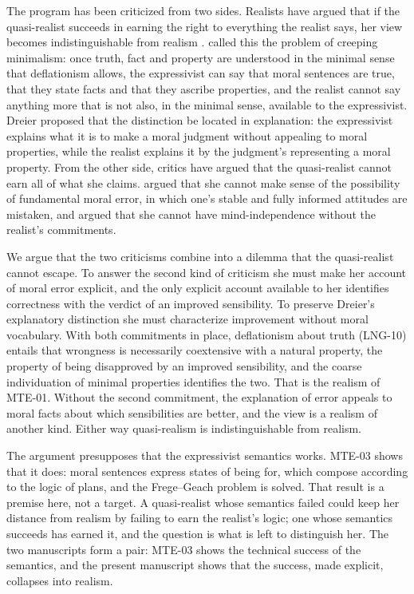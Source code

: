 \documentclass{situationist-preprint}
\begin{document}
The program has been criticized from two sides. Realists have argued that if the quasi-realist succeeds in earning the right to everything the realist says, her view becomes indistinguishable from realism \citep{Wright1992,Rosen1998,Dworkin1996}. \citet{Dreier2004} called this the problem of creeping minimalism: once truth, fact and property are understood in the minimal sense that deflationism allows, the expressivist can say that moral sentences are true, that they state facts and that they ascribe properties, and the realist cannot say anything more that is not also, in the minimal sense, available to the expressivist. Dreier proposed that the distinction be located in explanation: the expressivist explains what it is to make a moral judgment without appealing to moral properties, while the realist explains it by the judgment's representing a moral property. From the other side, critics have argued that the quasi-realist cannot earn all of what she claims. \citet{Egan2007} argued that she cannot make sense of the possibility of fundamental moral error, in which one's stable and fully informed attitudes are mistaken, and \citet{Street2011} argued that she cannot have mind-independence without the realist's commitments.

We argue that the two criticisms combine into a dilemma that the quasi-realist cannot escape. To answer the second kind of criticism she must make her account of moral error explicit, and the only explicit account available to her identifies correctness with the verdict of an improved sensibility. To preserve Dreier's explanatory distinction she must characterize improvement without moral vocabulary. With both commitments in place, deflationism about truth (LNG-10) entails that wrongness is necessarily coextensive with a natural property, the property of being disapproved by an improved sensibility, and the coarse individuation of minimal properties identifies the two. That is the realism of MTE-01. Without the second commitment, the explanation of error appeals to moral facts about which sensibilities are better, and the view is a realism of another kind. Either way quasi-realism is indistinguishable from realism.

The argument presupposes that the expressivist semantics works. MTE-03 shows that it does: moral sentences express states of being for, which compose according to the logic of plans, and the Frege--Geach problem is solved. That result is a premise here, not a target. A quasi-realist whose semantics failed could keep her distance from realism by failing to earn the realist's logic; one whose semantics succeeds has earned it, and the question is what is left to distinguish her. The two manuscripts form a pair: MTE-03 shows the technical success of the semantics, and the present manuscript shows that the success, made explicit, collapses into realism.
\end{document}

